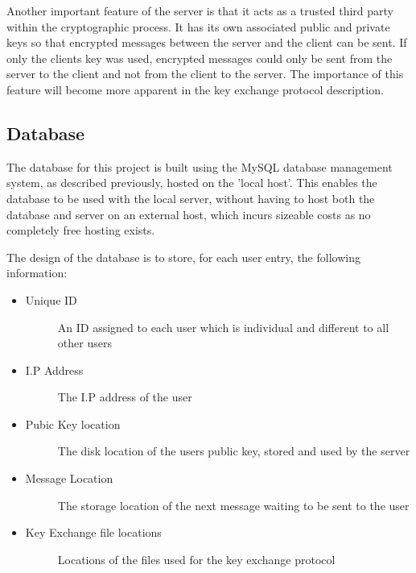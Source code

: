 \documentclass[a4paper,12pt]{report}
\begin{document}
Another important feature of the server is that it acts as a trusted third party within the cryptographic process. It has its own associated public and private keys so that encrypted messages between the server and the client can be sent. If only the clients key was used, encrypted messages could only be sent from the server to the client and not from the client to the server. The importance of this feature will become more apparent in the key exchange protocol description. 

\subsection{Database}

The database for this project is built using the MySQL database management system, as described previously, hosted on the 'local host'. This enables the database to be used with the local server, without having to host both the database and server on an external host, which incurs sizeable costs as no completely free hosting exists. 

The design of the database is to store, for each user entry, the following information:

\begin{itemize}
 \item\begin{description}
   \item[Unique ID] An ID assigned to each user which is individual and different to all other users 
 \end{description} 
 \item\begin{description}
   \item[I.P Address] The I.P address of the user 
 \end{description}
 \item\begin{description}
   \item[Pubic Key location] The disk location of the users public key, stored and used by the server 
 \end{description}
 \item\begin{description}
   \item[Message Location] The storage location of the next message waiting to be sent to the user
 \end{description}
 \item\begin{description}
   \item[Key Exchange file locations] Locations of the files used for the key exchange protocol 
 \end{description}
\end{itemize}
\end{document}
